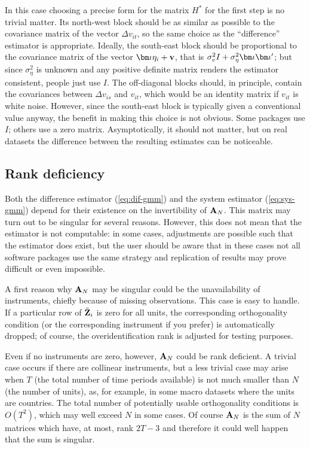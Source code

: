 In this case choosing a precise form for the matrix $H^*$ for the
first step is no trivial matter. Its north-west block should be as
similar as possible to the covariance matrix of the vector $\Delta
v_{it}$, so the same choice as the ``difference'' estimator is
appropriate. Ideally, the south-east block should be proportional to
the covariance matrix of the vector $\biota \eta_i + \bv$, that is
$\sigma^2_{v} I + \sigma^2_{\eta} \biota \biota'$; but since
$\sigma^2_{\eta}$ is unknown and any positive definite matrix renders
the estimator consistent, people just use $I$. The off-diagonal blocks
should, in principle, contain the covariances between $\Delta v_{is}$
and $v_{it}$, which would be an identity matrix if $v_{it}$ is white
noise. However, since the south-east block is typically given a
conventional value anyway, the benefit in making this choice is not
obvious. Some packages use $I$; others use a zero matrix.
Asymptotically, it should not matter, but on real datasets the
difference between the resulting estimates can be noticeable.

\subsection{Rank deficiency}
\label{sec:rankdef}

Both the difference estimator (\ref{eq:dif-gmm}) and the system
estimator (\ref{eq:sys-gmm}) depend for their existence on the
invertibility of $\mathbf{A}_N$. This matrix may turn out to be singular for
several reasons. However, this does not mean that the estimator is not
computable: in some cases, adjustments are possible such that the
estimator does exist, but the user should be aware that in these cases
not all software packages use the same strategy and replication of
results may prove difficult or even impossible.

A first reason why $\mathbf{A}_N$ may be singular could be the unavailability
of instruments, chiefly because of missing observations. This case is
easy to handle. If a particular row of $\tilde{\mathbf{Z}}_i$ is zero for all
units, the corresponding orthogonality condition (or the corresponding
instrument if you prefer) is automatically dropped; of course, the
overidentification rank is adjusted for testing purposes.

Even if no instruments are zero, however, $\mathbf{A}_N$ could be rank
deficient. A trivial case occurs if there are collinear instruments,
but a less trivial case may arise when $T$ (the total number of time
periods available) is not much smaller than $N$ (the number of units),
as, for example, in some macro datasets where the units are
countries. The total number of potentially usable orthogonality
conditions is $O(T^2)$, which may well exceed $N$ in some cases. Of
course $\mathbf{A}_N$ is the sum of $N$ matrices which have, at most, rank $2T -
3$ and therefore it could well happen that the sum is singular.

